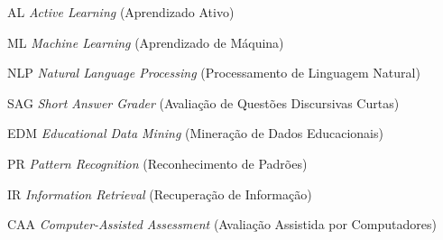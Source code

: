 \documentclass[
	12pt,				%
	openright,			%
	twoside,			%
	a4paper,			%
	english,			%
	french,				%
	spanish,			%
	brazil				%
	]{abntex2}
\begin{document}
\listoffigures*
\cleardoublepage

\listoftables*
\cleardoublepage

\begin{siglas}
  \item[AL] \textit{Active Learning} (Aprendizado Ativo)
  \item[ML] \textit{Machine Learning} (Aprendizado de Máquina)
  \item[NLP] \textit{Natural Language Processing} (Processamento de Linguagem Natural)
  \item[SAG] \textit{Short Answer Grader} (Avaliação de Questões Discursivas Curtas)
  \item[EDM] \textit{Educational Data Mining} (Mineração de Dados Educacionais)
  \item[PR] \textit{Pattern Recognition} (Reconhecimento de Padrões)
  \item[IR] \textit{Information Retrieval} (Recuperação de Informação)
  \item[CAA] \textit{Computer-Assisted Assessment} (Avaliação Assistida por Computadores)
\end{siglas}

\tableofcontents*
\cleardoublepage

\newpage



\textual









\postextual




\begin{apendicesenv}

\partapendices




\end{apendicesenv}


\printindex

\end{document}
